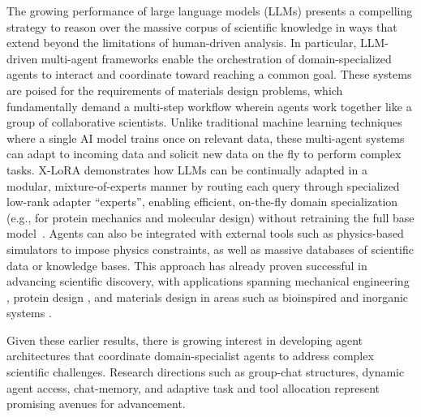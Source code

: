 The growing performance of large language models (LLMs) \cite{Vaswani2017attention, touvron_llama_2023, wei_emergent_2022, zhao_survey_2023, teubner_welcome_2023, naveed_comprehensive_2023} presents a compelling strategy to reason over the massive corpus of scientific knowledge \cite{zhang_exploring_2025, rueda_understanding_2025} in ways that extend beyond the limitations of human-driven analysis. In particular, LLM-driven multi-agent frameworks enable the orchestration of domain-specialized agents to interact and coordinate toward reaching a common goal. These systems are poised for the requirements of materials design problems, which fundamentally demand a multi-step workflow wherein agents work together like a group of collaborative scientists. Unlike traditional machine learning techniques where a single AI model trains once on relevant data, these multi-agent systems can adapt to incoming data and solicit new data on the fly to perform complex tasks. X-LoRA demonstrates how LLMs can be continually adapted in a modular, mixture-of-experts manner by routing each query through specialized low-rank adapter ``experts'', enabling efficient, on-the-fly domain specialization (e.g., for protein mechanics and molecular design) without retraining the full base model~\cite{Buehler2024XLoRA}. Agents can also be integrated with external tools such as physics-based simulators to impose physics constraints, as well as massive databases of scientific data or knowledge bases. This approach has already proven successful in advancing scientific discovery, with applications spanning mechanical engineering \cite{ni_mechagents_2024, Buehler2023MechGPTModalities}, protein design \cite{ghafarollahi_protagents_2024, ghafarollahi2025sparks}, and materials design in areas such as bioinspired and inorganic systems \cite{luu_bioinspiredllm_2024,ghafarollahi2025sparks, luu_generative_2025, stewart_molecular_2025, stewart_higher-order_2026}.

Given these earlier results, there is growing interest in developing agent architectures that coordinate domain-specialist agents to address complex scientific challenges. Research directions such as group-chat structures, dynamic agent access, chat-memory, and adaptive task and tool allocation represent promising avenues for advancement.

